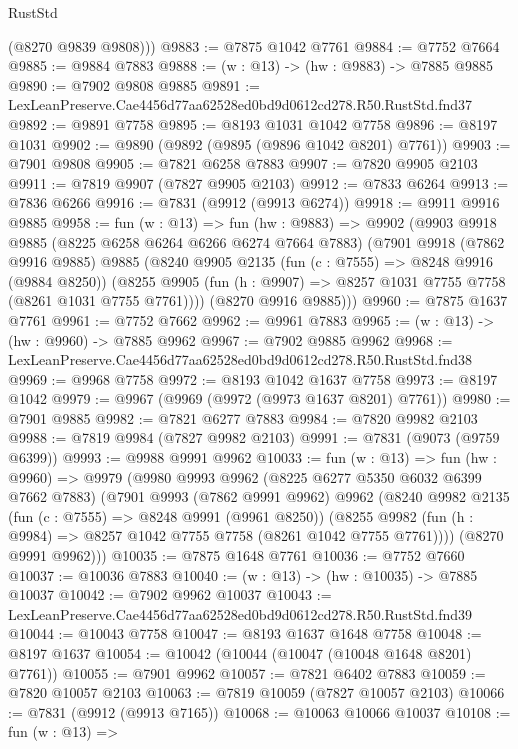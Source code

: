 \begin{lexlean}{RustStd}
\begin{coremodule}
        (@8270 @9839 @9808)))
@9883 := @7875 @1042 @7761
@9884 := @7752 @7664
@9885 := @9884 @7883
@9888 := (w : @13) -> (hw : @9883) -> @7885 @9885
@9890 := @7902 @9808 @9885
@9891 := LexLeanPreserve.Cae4456d77aa62528ed0bd9d0612cd278.R50.RustStd.fnd37
@9892 := @9891 @7758
@9895 := @8193 @1031 @1042 @7758
@9896 := @8197 @1031
@9902 := @9890 (@9892 (@9895 (@9896 @1042 @8201) @7761))
@9903 := @7901 @9808
@9905 := @7821 @6258 @7883
@9907 := @7820 @9905 @2103
@9911 := @7819 @9907 (@7827 @9905 @2103)
@9912 := @7833 @6264
@9913 := @7836 @6266
@9916 := @7831 (@9912 (@9913 @6274))
@9918 := @9911 @9916 @9885
@9958 := fun (w : @13) =>
  fun (hw : @9883) =>
  @9902
    (@9903
      @9918
      @9885
      (@8225 @6258 @6264 @6266 @6274 @7664 @7883)
      (@7901
        @9918
        (@7862 @9916 @9885)
        @9885
        (@8240
          @9905
          @2135
          (fun (c : @7555) => @8248 @9916 (@9884 @8250))
          (@8255 @9905 (fun (h : @9907) => @8257 @1031 @7755 @7758 (@8261 @1031 @7755 @7761))))
        (@8270 @9916 @9885)))
@9960 := @7875 @1637 @7761
@9961 := @7752 @7662
@9962 := @9961 @7883
@9965 := (w : @13) -> (hw : @9960) -> @7885 @9962
@9967 := @7902 @9885 @9962
@9968 := LexLeanPreserve.Cae4456d77aa62528ed0bd9d0612cd278.R50.RustStd.fnd38
@9969 := @9968 @7758
@9972 := @8193 @1042 @1637 @7758
@9973 := @8197 @1042
@9979 := @9967 (@9969 (@9972 (@9973 @1637 @8201) @7761))
@9980 := @7901 @9885
@9982 := @7821 @6277 @7883
@9984 := @7820 @9982 @2103
@9988 := @7819 @9984 (@7827 @9982 @2103)
@9991 := @7831 (@9073 (@9759 @6399))
@9993 := @9988 @9991 @9962
@10033 := fun (w : @13) =>
  fun (hw : @9960) =>
  @9979
    (@9980
      @9993
      @9962
      (@8225 @6277 @5350 @6032 @6399 @7662 @7883)
      (@7901
        @9993
        (@7862 @9991 @9962)
        @9962
        (@8240
          @9982
          @2135
          (fun (c : @7555) => @8248 @9991 (@9961 @8250))
          (@8255 @9982 (fun (h : @9984) => @8257 @1042 @7755 @7758 (@8261 @1042 @7755 @7761))))
        (@8270 @9991 @9962)))
@10035 := @7875 @1648 @7761
@10036 := @7752 @7660
@10037 := @10036 @7883
@10040 := (w : @13) -> (hw : @10035) -> @7885 @10037
@10042 := @7902 @9962 @10037
@10043 := LexLeanPreserve.Cae4456d77aa62528ed0bd9d0612cd278.R50.RustStd.fnd39
@10044 := @10043 @7758
@10047 := @8193 @1637 @1648 @7758
@10048 := @8197 @1637
@10054 := @10042 (@10044 (@10047 (@10048 @1648 @8201) @7761))
@10055 := @7901 @9962
@10057 := @7821 @6402 @7883
@10059 := @7820 @10057 @2103
@10063 := @7819 @10059 (@7827 @10057 @2103)
@10066 := @7831 (@9912 (@9913 @7165))
@10068 := @10063 @10066 @10037
@10108 := fun (w : @13) =>

\end{coremodule}
\end{lexlean}
